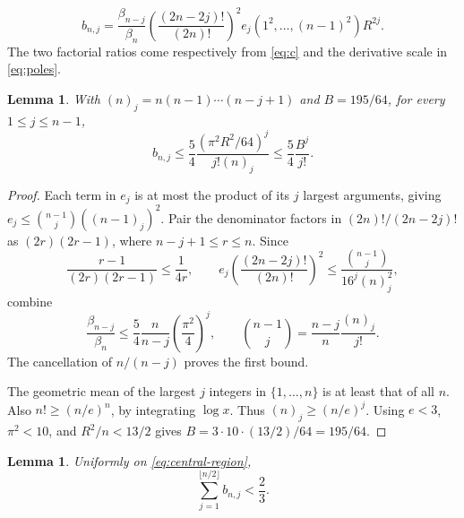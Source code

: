 \documentclass[11pt,letterpaper]{article}
\numberwithin{equation}{section}
\newtheorem{lemma}[theorem]{Lemma}
\begin{document}
\begin{equation}\label{eq:b}
 b_{n,j}=\frac{\beta_{n-j}}{\beta_n}
 \left(\frac{(2n-2j)!}{(2n)!}\right)^2
 e_j(1^2,\ldots,(n-1)^2)R^{2j}.
\end{equation}
The two factorial ratios come respectively from \eqref{eq:c} and the derivative scale in \eqref{eq:poles}.
\begin{lemma}\label{lem:all-j}
With $(n)_j=n(n-1)\cdots(n-j+1)$ and $B=195/64$, for every $1\le j\le n-1$,
\begin{equation}\label{eq:all-j}
 b_{n,j}\le\frac54\frac{(\pi^2R^2/64)^j}{j!(n)_j}
 \le\frac54\frac{B^j}{j!}.
\end{equation}
\end{lemma}
\begin{proof}
Each term in $e_j$ is at most the product of its $j$ largest arguments, giving
$e_j\le\binom{n-1}{j}((n-1)_j)^2$. Pair the denominator factors in $(2n)!/(2n-2j)!$ as $(2r)(2r-1)$, where $n-j+1\le r\le n$. Since
\[
 \frac{r-1}{(2r)(2r-1)}\le\frac1{4r},\qquad
 e_j\left(\frac{(2n-2j)!}{(2n)!}\right)^2
 \le\frac{\binom{n-1}{j}}{16^j(n)_j^2},
\]
combine
\[
 \frac{\beta_{n-j}}{\beta_n}\le\frac54\frac n{n-j}\left(\frac{\pi^2}4\right)^j,
 \qquad \binom{n-1}{j}=\frac{n-j}{n}\frac{(n)_j}{j!}.
\]
The cancellation of $n/(n-j)$ proves the first bound.

The geometric mean of the largest $j$ integers in $\{1,\ldots,n\}$ is at least that of all $n$. Also $n!\ge(n/e)^n$, by integrating $\log x$. Thus $(n)_j\ge(n/e)^j$. Using $e<3$, $\pi^2<10$, and $R^2/n<13/2$ gives $B=3\cdot10\cdot(13/2)/64=195/64$.
\end{proof}
\begin{lemma}\label{lem:small-j}
Uniformly on \eqref{eq:central-region},
\begin{equation}\label{eq:small-j-total}\sum_{j=1}^{\lfloor n/2\rfloor}b_{n,j}<\frac23.\end{equation}
\end{lemma}
\end{document}
